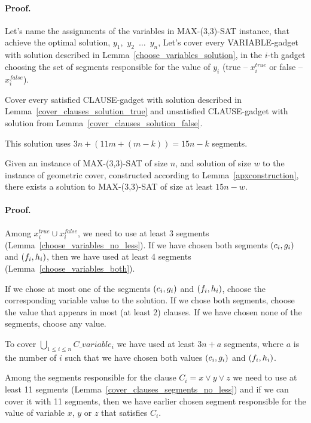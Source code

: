 \paragraph{Proof.}
Let's name the assignments of the variables in MAX-(3,3)-SAT instance,
that achieve the optimal solution,
$y_1$,~$y_2$~$\ldots$~$y_n$,
Let's cover every VARIABLE-gadget with solution described in
Lemma~\ref{choose_variables_solution},
in the $i$-th gadget choosing the set of segments responsible for the
value of $y_i$
(true -- $x_i^{true}$ or false -- $x_i^{false}$).

Cover every satisfied CLAUSE-gadget with solution described in
Lemma~\ref{cover_clauses_solution_true}
and unsatisfied CLAUSE-gadget with solution from
Lemma~\ref{cover_clauses_solution_false}.

This solution uses $3n + (11m + (m-k)) = 15n - k$ segments.

\begin{lemma}
	\label{construction_completness}
	Given an instance of MAX-(3,3)-SAT of size $n$,
	and solution of size $w$ to the instance of geometric cover,
	constructed	according to Lemma~\ref{apxconstruction},  
	there exists a solution to MAX-(3,3)-SAT of size at least $15n - w$.
\end{lemma}
\paragraph{Proof.}
Among $x_i^{true} \cup x_i^{false}$,
we need to use at least 3 segments (Lemma~\ref{choose_variables_no_less}).
If we have chosen both segments $(c_i, g_i)$ and $(f_i, h_i)$,
then we have used at least 4 segments (Lemma~\ref{choose_variables_both}).

If we chose at most one of the segments $(c_i, g_i)$ and $(f_i, h_i)$,
choose the corresponding variable value to the solution.
If we chose both segments,
choose the value that appears in most (at least 2) clauses.
If we have chosen none of the segments, choose any value.

To cover $\bigcup_{1 \le i \le n} C\_variable_i$
we have used at least $3n + a$ segments,
where $a$ is the number of $i$ such that we have chosen both
values $(c_i, g_i)$ and $(f_i, h_i)$.

Among the segments responsible for the clause $C_i = x \lor y \lor z$
we need to use at least 11 segments
(Lemma~\ref{cover_clauses_segments_no_less})
and if we can cover it with 11 segments, then we have 
earlier chosen
segment responsible for the value of variable $x$, $y$ or $z$
that satisfies $C_i$.

